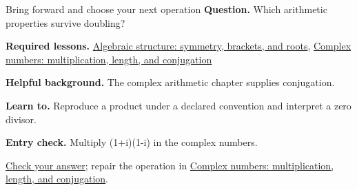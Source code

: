 \begin{learningcard}{Bring forward and choose your next operation}
\textsf{\textbf{Question.}} Which arithmetic properties survive doubling?\par
\textbf{Required lessons.} \hyperref[learn:algebra]{Algebraic structure: symmetry, brackets, and roots}, \hyperref[learn:complex_numbers]{Complex numbers: multiplication, length, and conjugation}\par
\textbf{Helpful background.} The complex arithmetic chapter supplies conjugation.\par
\textbf{Learn to.} Reproduce a product under a declared convention and interpret a zero divisor.\par
\textbf{Entry check.} Multiply (1+i)(1-i) in the complex numbers.\par
\hyperref[solution:entry:hypercomplex]{Check your answer}; repair the operation in \hyperref[learn:complex_numbers]{Complex numbers: multiplication, length, and conjugation}.
\end{learningcard}
